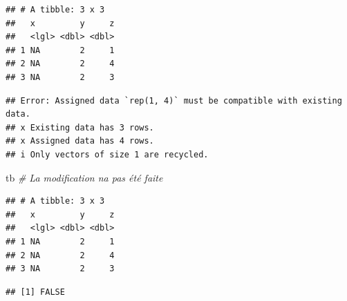 \documentclass[
  11pt,
]{book}
\newenvironment{Shaded}{\begin{snugshade}}{\end{snugshade}}
\newcommand{\CommentTok}[1]{\textcolor[rgb]{0.56,0.35,0.01}{\textit{#1}}}
\newcommand{\DecValTok}[1]{\textcolor[rgb]{0.00,0.00,0.81}{#1}}
\newcommand{\KeywordTok}[1]{\textcolor[rgb]{0.13,0.29,0.53}{\textbf{#1}}}
\newcommand{\NormalTok}[1]{#1}
\newcommand{\OperatorTok}[1]{\textcolor[rgb]{0.81,0.36,0.00}{\textbf{#1}}}
\newcommand{\StringTok}[1]{\textcolor[rgb]{0.31,0.60,0.02}{#1}}
\numberwithin{equation}{section}
\numberwithin{countremarque}{section}
\begin{document}
\begin{lstlisting}
## # A tibble: 3 x 3
##   x         y     z
##   <lgl> <dbl> <dbl>
## 1 NA        2     1
## 2 NA        2     4
## 3 NA        2     3
\end{lstlisting}

\begin{Shaded}
\end{Shaded}

\begin{lstlisting}
## Error: Assigned data `rep(1, 4)` must be compatible with existing data.
## x Existing data has 3 rows.
## x Assigned data has 4 rows.
## i Only vectors of size 1 are recycled.
\end{lstlisting}

\begin{Shaded}
\begin{Highlighting}[]
\NormalTok{tb  }\CommentTok{\# La modification n\textquotesingle{}a pas été faite}
\end{Highlighting}
\end{Shaded}

\begin{lstlisting}
## # A tibble: 3 x 3
##   x         y     z
##   <lgl> <dbl> <dbl>
## 1 NA        2     1
## 2 NA        2     4
## 3 NA        2     3
\end{lstlisting}

\begin{Shaded}
\end{Shaded}

\begin{lstlisting}
## [1] FALSE
\end{lstlisting}

\begin{Shaded}
\end{Shaded}
\end{document}
